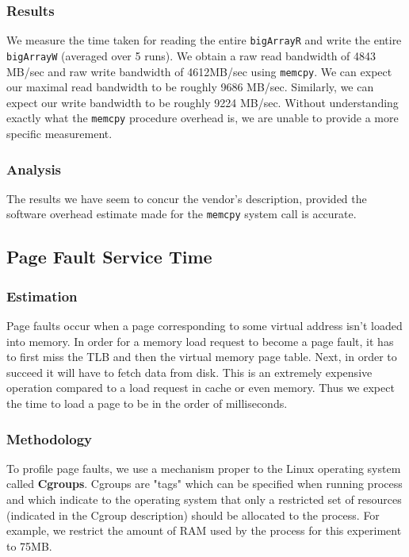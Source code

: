 \subsubsection{Results}


We measure the time taken for reading the entire \texttt{bigArrayR} and write the entire \texttt{bigArrayW} (averaged over 5 runs). 
We obtain a raw read bandwidth of 4843 MB/sec and raw write bandwidth of 4612MB/sec using \texttt{memcpy}. We can expect our maximal read bandwidth to be roughly 9686 MB/sec. Similarly, we can expect our write bandwidth to be roughly 9224 MB/sec. Without understanding exactly what the \texttt{memcpy} procedure overhead is, we are unable to provide a more specific measurement.

\subsubsection{Analysis}

The results we have seem to concur the vendor's description, provided the software overhead estimate made for the \texttt{memcpy} system call is accurate.

\subsection{Page Fault Service Time}

\subsubsection{Estimation}

Page faults occur when a page corresponding to some virtual address isn't loaded into memory. In order for a memory load request to become a page fault, it has to first miss the TLB and then the virtual memory page table. Next, in order to succeed it will have to fetch data from disk. This is an extremely expensive operation compared to a load request in cache or even memory. Thus we expect the time to load a page to be in the order of milliseconds.

\subsubsection{Methodology}

To profile page faults, we use a mechanism proper to the Linux operating system called \textbf{Cgroups}. Cgroups are "tags" which can be specified when running process and which indicate to the operating system that only a restricted set of resources (indicated in the Cgroup description) should be allocated to the process. For example, we restrict the amount of RAM used by the process for this experiment to 75MB.

